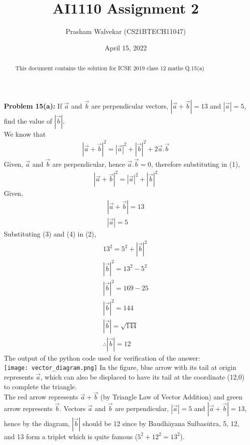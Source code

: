 \documentclass[journal,12pt,twocolumn]{IEEEtran}
\begin{document}
     \def\centbox#1{\makebox[0in]{#1}}
     \def\topbox#1{\raisebox{-\baselineskip}[0in][0in]{#1}}
     \def\midbox#1{\raisebox{-0.5\baselineskip}[0in][0in]{#1}}
\vspace{3cm}
\setlength{\columnsep}{0.70cm}
\title{\Huge{\textbf{AI1110 Assignment 2}}}
\author{Prasham Walvekar (CS21BTECH11047)}
\date{April 15, 2022}
\maketitle
\newpage
\bigskip
\begin{abstract}
This document contains the solution for ICSE 2019 class 12 maths Q.15(a)  
\end{abstract}
\textbf{\large{Problem 15(a):}} \large{If \(\vec{a}\) and \(\vec{b}\) are perpendicular vectors, $\left| \vec{a}+\vec{b} \right| = 13 $ and $\left| \vec{a} \right| = 5$, find the value of $\left| \vec{b} \right|$.}\\
\solution
We know that
\begin{align}
\left| \vec{a}+\vec{b} \right|^2 = \left| \vec{a} \right|^2 + \left| \vec{b} \right|^2 + 2 \vec{a}.\vec{b}
\end{align}
Given, $\vec{a}$ and $\vec{b}$ are perpendicular, hence $\vec{a}.\vec{b}=0$, therefore substituting in (1),
\begin{align}
\left| \vec{a}+\vec{b} \right|^2 = \left| \vec{a} \right|^2 + \left| \vec{b} \right|^2
\end{align}
Given,
\begin{align}
\left| \vec{a}+\vec{b} \right| = 13\\
\left| \vec{a} \right| = 5
\end{align}
Substituting (3) and (4) in (2),
\begin{align}
13^2 = 5^2 + \left| \vec{b} \right|^2\\
\left| \vec{b} \right|^2 = 13^2 - 5^2\\
\left| \vec{b} \right|^2 = 169 - 25\\ 
\left| \vec{b} \right|^2 = 144\\
\left| \vec{b} \right| = \sqrt{144}\\
\therefore \left| \vec{b} \right| = 12
\end{align}
The output of the python code used for verification of the answer:\\
\texttt{[image: vector\_diagram.png]}
In the figure, blue arrow with its tail at origin represents $\vec{a}$, which can also be displaced to have its tail at the coordinate (12,0) to complete the triangle.\\
The red arrow represents $\vec{a}+\vec{b}$ (by Triangle Law of Vector Addition) and green arrow represents $\vec{b}$. Vectors $\vec{a}$ and $\vec{b}$ are perpendicular, $\left| \vec{a} \right| = 5$ and $\left| \vec{a}+\vec{b} \right| = 13$, hence by the diagram, $\left| \vec{b} \right|$ should be 12 since by Baudhāyana Sulbasūtra, 5, 12, and 13 form a triplet which is quite famous ($5^2+12^2=13^2$).
\end{document}
